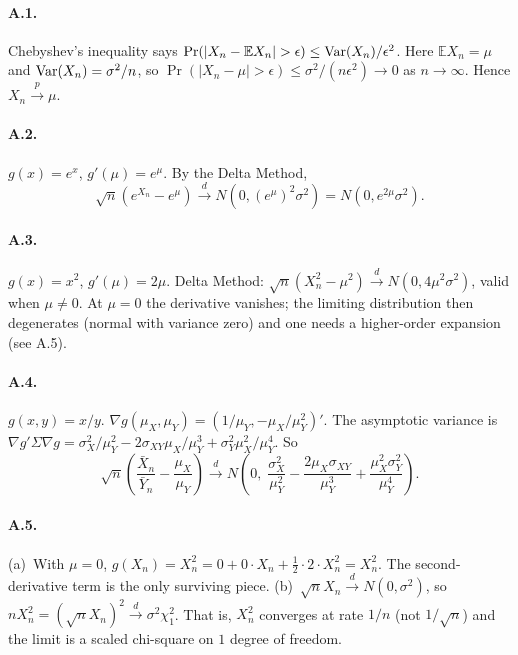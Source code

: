 \documentclass{article}
\newcommand{\E}{\mathbb{E}}
\newcommand{\pconv}{\xrightarrow{p}}
\newcommand{\dconv}{\xrightarrow{d}}
\begin{document}
\paragraph{A.1.}  Chebyshev's inequality says $\Pr(|X_n - \E X_n| > \epsilon) \leq \Var(X_n)/\epsilon^2$.  Here $\E X_n = \mu$ and $\mbox{Var}(X_n) = \sigma^2/n$, so $\Pr(|X_n - \mu| > \epsilon) \leq \sigma^2/(n\epsilon^2) \to 0$ as $n \to \infty$.  Hence $X_n \pconv \mu$.

\paragraph{A.2.}  $g(x) = e^x$, $g'(\mu) = e^\mu$.  By the Delta Method,
$$\sqrt{n}(e^{X_n} - e^\mu) \dconv N(0, (e^\mu)^2\sigma^2) = N(0, e^{2\mu}\sigma^2).$$

\paragraph{A.3.}  $g(x) = x^2$, $g'(\mu) = 2\mu$.  Delta Method: $\sqrt{n}(X_n^2 - \mu^2) \dconv N(0, 4\mu^2\sigma^2)$, valid when $\mu \neq 0$.  At $\mu = 0$ the derivative vanishes; the limiting distribution then degenerates (normal with variance zero) and one needs a higher-order expansion (see A.5).

\paragraph{A.4.}  $g(x, y) = x/y$.  $\nabla g(\mu_X, \mu_Y) = (1/\mu_Y, -\mu_X/\mu_Y^2)'$.  The asymptotic variance is $\nabla g'\Sigma\nabla g = \sigma_X^2/\mu_Y^2 - 2\sigma_{XY}\mu_X/\mu_Y^3 + \sigma_Y^2\mu_X^2/\mu_Y^4$.  So
$$\sqrt{n}\!\left(\frac{\bar X_n}{\bar Y_n} - \frac{\mu_X}{\mu_Y}\right) \dconv N\!\left(0,\; \frac{\sigma_X^2}{\mu_Y^2} - \frac{2\mu_X\sigma_{XY}}{\mu_Y^3} + \frac{\mu_X^2\sigma_Y^2}{\mu_Y^4}\right).$$

\paragraph{A.5.}  (a)~With $\mu = 0$, $g(X_n) = X_n^2 = 0 + 0 \cdot X_n + \tfrac{1}{2}\cdot 2 \cdot X_n^2 = X_n^2$.  The second-derivative term is the only surviving piece.  (b)~$\sqrt{n}X_n \dconv N(0, \sigma^2)$, so $n X_n^2 = (\sqrt{n}X_n)^2 \dconv \sigma^2\chi^2_1$.  That is, $X_n^2$ converges at rate $1/n$ (not $1/\sqrt{n}$) and the limit is a scaled chi-square on $1$ degree of freedom.

\bigskip
\end{document}

